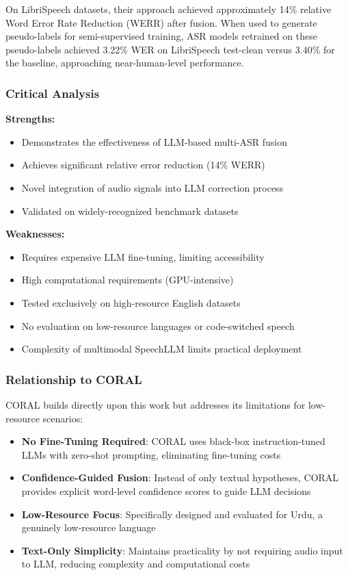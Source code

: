 On LibriSpeech datasets, their approach achieved approximately 14\% relative Word Error Rate Reduction (WERR) after fusion. When used to generate pseudo-labels for semi-supervised training, ASR models retrained on these pseudo-labels achieved 3.22\% WER on LibriSpeech test-clean versus 3.40\% for the baseline, approaching near-human-level performance.

\subsubsection{Critical Analysis}

\textbf{Strengths:}
\begin{itemize}
    \item Demonstrates the effectiveness of LLM-based multi-ASR fusion
    \item Achieves significant relative error reduction (14\% WERR)
    \item Novel integration of audio signals into LLM correction process
    \item Validated on widely-recognized benchmark datasets
\end{itemize}

\textbf{Weaknesses:}
\begin{itemize}
    \item Requires expensive LLM fine-tuning, limiting accessibility
    \item High computational requirements (GPU-intensive)
    \item Tested exclusively on high-resource English datasets
    \item No evaluation on low-resource languages or code-switched speech
    \item Complexity of multimodal SpeechLLM limits practical deployment
\end{itemize}

\subsubsection{Relationship to CORAL}

CORAL builds directly upon this work but addresses its limitations for low-resource scenarios:

\begin{itemize}
    \item \textbf{No Fine-Tuning Required}: CORAL uses black-box instruction-tuned LLMs with zero-shot prompting, eliminating fine-tuning costs
    \item \textbf{Confidence-Guided Fusion}: Instead of only textual hypotheses, CORAL provides explicit word-level confidence scores to guide LLM decisions
    \item \textbf{Low-Resource Focus}: Specifically designed and evaluated for Urdu, a genuinely low-resource language
    \item \textbf{Text-Only Simplicity}: Maintains practicality by not requiring audio input to LLM, reducing complexity and computational costs
\end{itemize}

